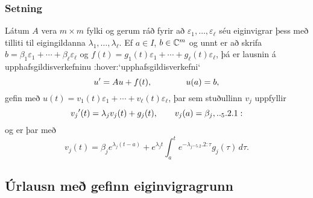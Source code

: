 \subsubsection{Setning}
Látum $A$ vera $m\times m$ fylki og gerum ráð fyrir að 
$\varepsilon_1,\dots,\varepsilon_\ell$   séu eiginvigrar
þess með tilliti til eigingildanna $\lambda_1,\dots,\lambda_\ell$.  
Ef $a \in I$, $b\in {\mathbb C}^m$ og unnt er að skrifa
$b=\beta_1\varepsilon_1+\cdots+\beta_\ell\varepsilon_\ell$ og 
$f(t)=g_1(t)\varepsilon_1+\cdots+g_\ell(t)\varepsilon_\ell$, þá er
lausnin á upphafsgildisverkefninu :hover:`upphafsgildisverkefni` 
$$u{\sp{\prime}}=Au+f(t), \qquad \qquad u(a)=b,
$$ 
gefin með  $u(t)=v_1(t)\varepsilon_1+\cdots+v_\ell(t)\varepsilon_\ell$, þar sem
stuðullinn $v_j$  uppfyllir
 \begin{equation*}v_j\dash(t)=\lambda_jv_j(t)+g_j(t), \qquad v_j(a)=\beta_j,

.. _5.2.1:

 \end{equation*}
og er þar með 
 \begin{equation*}v_j(t)=\beta_je^{\lambda_j(t-a)}+e^{\lambda_jt}\int_a^t e^{-\lambda_j

.. _5.2.2:

\tau}g_j(\tau) \, d\tau.
 \end{equation*}



\subsection*{Úrlausn með gefinn eiginvigragrunn}

